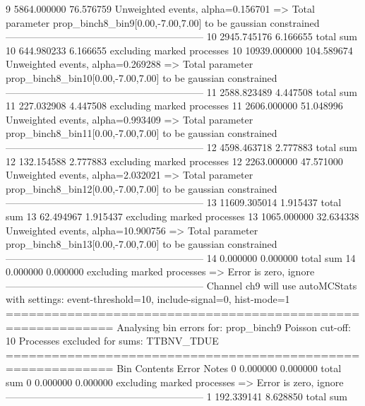 9          5864.000000     76.576759       Unweighted events, alpha=0.156701
  => Total parameter prop_binch8_bin9[0.00,-7.00,7.00] to be gaussian constrained
------------------------------------------------------------
10         2945.745176     6.166655        total sum                     
10         644.980233      6.166655        excluding marked processes    
10         10939.000000    104.589674      Unweighted events, alpha=0.269288
  => Total parameter prop_binch8_bin10[0.00,-7.00,7.00] to be gaussian constrained
------------------------------------------------------------
11         2588.823489     4.447508        total sum                     
11         227.032908      4.447508        excluding marked processes    
11         2606.000000     51.048996       Unweighted events, alpha=0.993409
  => Total parameter prop_binch8_bin11[0.00,-7.00,7.00] to be gaussian constrained
------------------------------------------------------------
12         4598.463718     2.777883        total sum                     
12         132.154588      2.777883        excluding marked processes    
12         2263.000000     47.571000       Unweighted events, alpha=2.032021
  => Total parameter prop_binch8_bin12[0.00,-7.00,7.00] to be gaussian constrained
------------------------------------------------------------
13         11609.305014    1.915437        total sum                     
13         62.494967       1.915437        excluding marked processes    
13         1065.000000     32.634338       Unweighted events, alpha=10.900756
  => Total parameter prop_binch8_bin13[0.00,-7.00,7.00] to be gaussian constrained
------------------------------------------------------------
14         0.000000        0.000000        total sum                     
14         0.000000        0.000000        excluding marked processes    
  => Error is zero, ignore      
------------------------------------------------------------
Channel ch9 will use autoMCStats with settings: event-threshold=10, include-signal=0, hist-mode=1
============================================================
Analysing bin errors for: prop_binch9
Poisson cut-off: 10
Processes excluded for sums: TTBNV_TDUE
============================================================
Bin        Contents        Error           Notes                         
0          0.000000        0.000000        total sum                     
0          0.000000        0.000000        excluding marked processes    
  => Error is zero, ignore      
------------------------------------------------------------
1          192.339141      8.628850        total sum                     
